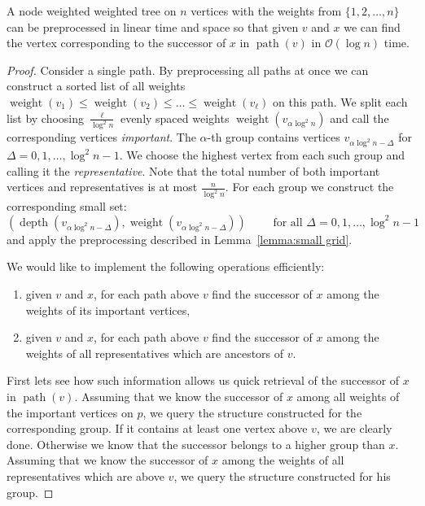 \documentclass[runningheads]{llncs}
\DeclareMathOperator{\ancestors}{path}
\DeclareMathOperator{\weight}{weight}
\DeclareMathOperator{\depth}{depth}
\begin{document}
\begin{lemma}\label{lemma:version preprocessing}
A node weighted weighted tree on $n$ vertices with the weights from $\{1,2,\ldots,n\}$ can be preprocessed in linear time and space so that given $v$ and $x$ we can find the vertex corresponding to the successor of $x$ in $\ancestors(v)$ in $\mathcal{O}(\log n)$ time.
\end{lemma}

\begin{proof}
Consider a single path. By preprocessing all paths at once we can construct a sorted list of all weights $\weight(v_{1})\leq\weight(v_{2})\leq\ldots\leq\weight(v_{\ell})$ on this path. We split each list by choosing $\frac{\ell}{\log^{2} n}$ evenly spaced weights $\weight(v_{\alpha\log^{2} n})$ and call the corresponding vertices \emph{important}. The $\alpha$-th group contains vertices $v_{\alpha \log^{2}n-\Delta}$ for $\Delta=0,1,\ldots,\log^{2}n-1$. We choose the highest vertex from each such group and calling it the {\it representative}. Note that the total number of both important vertices and representatives is at most $\frac{n}{\log^{2} n}$.  For each group we construct the corresponding small set:
$$\left(\depth(v_{\alpha\log^{2}n-\Delta}),\weight(v_{\alpha\log^{2}n-\Delta})\right) \qquad\text{ for all } \Delta=0,1,\dots,\log^{2}n-1$$
and apply the preprocessing described in Lemma~\ref{lemma:small grid}.

We would like to implement the following operations efficiently:
\begin{enumerate}
\item given $v$ and $x$, for each path above $v$ find the successor of $x$ among the weights of its important vertices,
\item given $v$ and $x$, for each path above $v$ find the successor of $x$ among the weights of all representatives which are ancestors of $v$.
\end{enumerate}
First lets see how such information allows us quick retrieval of the successor of $x$ in $\ancestors(v)$. Assuming that we know the successor of $x$ among all weights of the important vertices on $p$, we query the structure constructed for the corresponding group. If it contains at least one vertex above $v$, we are clearly done. Otherwise we know that the successor belongs to a higher group than $x$. Assuming that we know the successor of $x$ among the weights of all representatives which are above $v$, we query the structure constructed for his group.


\end{proof}
\end{document}
